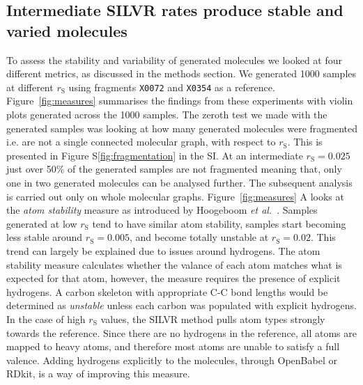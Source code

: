 \documentclass[journal=jacsat,manuscript=article]{achemso}
\begin{document}
\subsection{Intermediate SILVR rates produce stable and varied molecules}
To assess the stability and variability of generated molecules we looked at four different metrics, as discussed in the methods section. We generated 1000 samples at different $r_{\mathrm{S}}$ using fragments \texttt{X0072} and \texttt{X0354} as a reference. Figure~\ref{fig:measures} summarises the findings from these experiments with violin plots generated across the 1000 samples. The zeroth test we made with the generated samples was looking at how many generated molecules were fragmented i.e. are not a single connected molecular graph, with respect to $r_{\mathrm{S}}$. This is presented in Figure S\ref{fig:fragmentation} in the SI. At an intermediate $r_{\mathrm{S}} = 0.025$ just over 50\% of the generated samples are not fragmented meaning that, only one in two generated molecules can be analysed further. The subsequent analysis is carried out only on whole molecular graphs. 
Figure~\ref{fig:measures} A looks at the \textit{atom stability} measure as introduced by Hoogeboom \textit{et al.}~\cite{hoogeboom2022equivariant}. Samples generated at low $r_{\mathrm{S}}$ tend to have similar atom stability, samples start becoming less stable around $r_{\mathrm{S}}=0.005$, and become totally unstable at $r_{\mathrm{S}}=0.02$. This trend can largely be explained due to issues around hydrogens. The atom stability measure calculates whether the valance of each atom matches what is expected for that atom, however, the measure requires the presence of explicit hydrogens. A carbon skeleton with appropriate C-C bond lengths would be determined as \textit{unstable} unless each carbon was populated with explicit hydrogens. In the case of high $r_{\mathrm{S}}$ values, the SILVR method pulls atom types strongly towards the reference. Since there are no hydrogens in the reference, all atoms are mapped to heavy atoms, and therefore most atoms are unable to satisfy a full valence. Adding hydrogens explicitly to the molecules, through OpenBabel or RDkit, is a way of improving this measure. 
\end{document}
